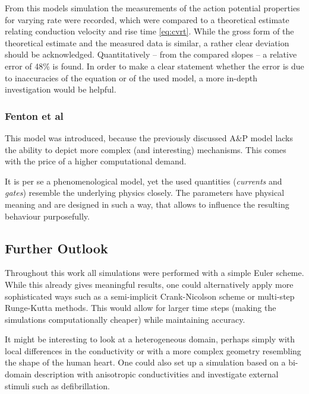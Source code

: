 From this models simulation the measurements of the action potential properties
for varying rate were recorded, which were compared to a theoretical estimate
relating conduction velocity and rise time \eqref{eq:cvrt}.
While the gross form of the theoretical estimate and the measured data is
similar, a rather clear deviation should be acknowledged. Quantitatively
-- from the compared slopes -- a relative error of 48\% is found. In order to
make a clear statement whether the error is due to inaccuracies of the equation
or of the used model, a more in-depth investigation would be helpful.

\subsubsection{Fenton et al}
This model was introduced, because the previously discussed A\&P model lacks
the ability to depict more complex (and interesting) mechanisms. This comes
with the price of a higher computational demand.

It is per se a phenomenological model, yet the used quantities (\emph{currents}
and \emph{gates}) resemble the underlying physics closely. The parameters have
physical meaning and are designed in such a way, that allows to influence the
resulting behaviour purposefully.

\subsection{Further Outlook}
Throughout this work all simulations were performed with a simple Euler scheme.
While this already gives meaningful results, one could alternatively apply more
sophisticated ways such as a semi-implicit Crank-Nicolson scheme or
multi-step Runge-Kutta methods. This would allow for larger time steps (making
the simulations computationally cheaper) while maintaining accuracy.

It might be interesting to look at a heterogeneous domain, perhaps simply with
local differences in the conductivity or with a more complex geometry
resembling the shape of the human heart. One could also set up a simulation
based on a bi-domain description with anisotropic conductivities and
investigate external stimuli such as defibrillation.


